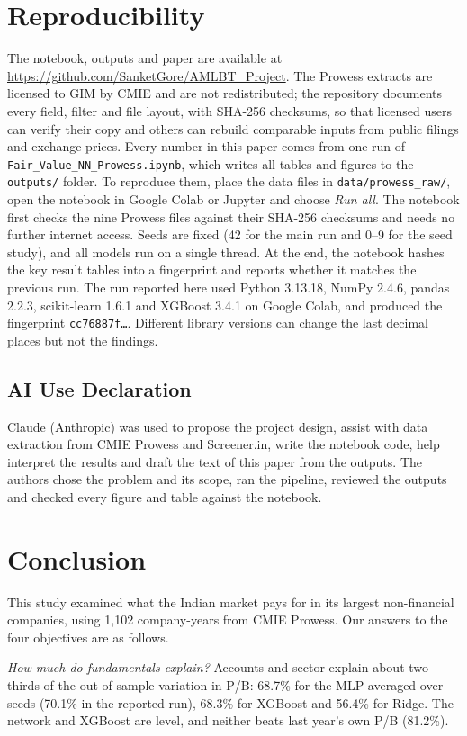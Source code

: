 \documentclass[conference]{IEEEtran}
\begin{document}
\section{Reproducibility}
The notebook, outputs and paper are available at \url{https://github.com/SanketGore/AMLBT_Project}. The Prowess extracts are licensed to GIM by CMIE and are not redistributed; the repository documents every field, filter and file layout, with SHA-256 checksums, so that licensed users can verify their copy and others can rebuild comparable inputs from public filings and exchange prices. Every number in this paper comes from one run of \texttt{Fair\_Value\_NN\_Prowess.ipynb}, which writes all tables and figures to the \texttt{outputs/} folder. To reproduce them, place the data files in \texttt{data/prowess\_raw/}, open the notebook in Google Colab or Jupyter and choose \emph{Run all}. The notebook first checks the nine Prowess files against their SHA-256 checksums and needs no further internet access. Seeds are fixed (42 for the main run and 0--9 for the seed study), and all models run on a single thread. At the end, the notebook hashes the key result tables into a fingerprint and reports whether it matches the previous run. The run reported here used Python 3.13.18, NumPy 2.4.6, pandas 2.2.3, scikit-learn 1.6.1 and XGBoost 3.4.1 on Google Colab, and produced the fingerprint \texttt{cc76887f\ldots}. Different library versions can change the last decimal places but not the findings.

\subsection{AI Use Declaration}
Claude (Anthropic) was used to propose the project design, assist with data extraction from CMIE Prowess and Screener.in, write the notebook code, help interpret the results and draft the text of this paper from the outputs. The authors chose the problem and its scope, ran the pipeline, reviewed the outputs and checked every figure and table against the notebook.

\section{Conclusion}
This study examined what the Indian market pays for in its largest non-financial companies, using 1,102 company-years from CMIE Prowess. Our answers to the four objectives are as follows.

\emph{How much do fundamentals explain?} Accounts and sector explain about two-thirds of the out-of-sample variation in P/B: 68.7\% for the MLP averaged over seeds (70.1\% in the reported run), 68.3\% for XGBoost and 56.4\% for Ridge. The network and XGBoost are level, and neither beats last year's own P/B (81.2\%).
\end{document}
